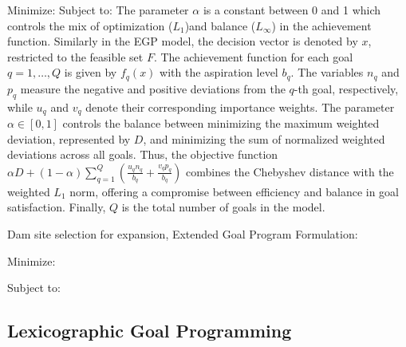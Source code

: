 Minimize:
            \EqEGPMinFunctionTen
Subject to:
            \EqGGPMinFunctionSubTwo
            \EqCGPConstraintSeven
            \EqCGPConstraintEight
            \EqGGPMinFunctionSubFour
            \EqCGPConstraintNine
The parameter $\alpha$ is a constant between 0 and 1 which controls the mix of optimization ($L_1$)and balance ($L_\infty$) in the achievement function.
Similarly in the EGP model, the decision vector is denoted by $x$, restricted to the feasible set $F$. The achievement function for each goal $q=1,\dots,Q$ is given by $f_q(x)$ with the aspiration level $b_q$. The variables $n_q$ and $p_q$ measure the negative and positive deviations from the $q$-th goal, respectively, while $u_q$ and $v_q$ denote their corresponding importance weights. The parameter $\alpha \in [0,1]$ controls the balance between minimizing the maximum weighted deviation, represented by $D$, and minimizing the sum of normalized weighted deviations across all goals. 
Thus, the objective function $\alpha D + (1-\alpha)\sum_{q=1}^{Q}\left(\tfrac{u_q n_q}{b_q}+\tfrac{v_q p_q}{b_q}\right)$ combines the Chebyshev distance with the weighted $L_1$ norm, offering a compromise between efficiency and balance in goal satisfaction. Finally, $Q$ is the total number of goals in the model.


Dam site selection for expansion, Extended Goal Program Formulation:

Minimize:
        \EqEGPObjectiveThirtyThree

Subject to:
            \EqDamHeightConstraintTwelve
            \EqDamCapacityConstraintThirteen
            \EqReservoirAreaConstraintFourteen
            \EqTemperatureConstraintFifteen
            \EqPopulationConstraintSixteen
            \EqRainfallConstraintSeventeen
            \EqResidenceConstraintEighteen
            \EqFarmlandDistanceConstraintNineteen
            \EqNearestRoadConstraintTwenty
            \EqFarmlandAreaConstraintTwentyOne
            \EqSelectThreeDamsTwentyTwo
            \EqBudgetConstraintTwentyThree
            \EqDConstraintOneNTwentyFour
            \EqDConstraintTwoNTwentyFive
            \EqDConstraintThreeNTwentySix
            \EqDConstraintFourNTwentySix
            \EqDConstraintFiveNTwentySeven
            \EqDConstraintSixNTwentyEight
            \EqDConstraintSevenNTwentyNine
            \EqDConstraintEightNThirty
            \EqDConstraintNineNThirtyOne
            \EqDConstraintTenNThirtyTwo

\subsection{Lexicographic Goal Programming}

